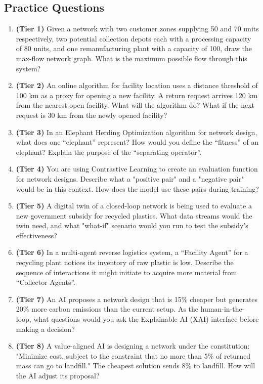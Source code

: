\documentclass{article}
\begin{document}
\newpage
\subsection{Practice Questions}
\begin{enumerate}[label=\textbf{Q\arabic*:}, wide, labelindent=0pt]
    \item \textbf{(Tier 1)} Given a network with two customer zones supplying 50 and 70 units respectively, two potential collection depots each with a processing capacity of 80 units, and one remanufacturing plant with a capacity of 100, draw the max-flow network graph. What is the maximum possible flow through this system?
    \item \textbf{(Tier 2)} An online algorithm for facility location uses a distance threshold of 100 km as a proxy for opening a new facility. A return request arrives 120 km from the nearest open facility. What will the algorithm do? What if the next request is 30 km from the newly opened facility?
    \item \textbf{(Tier 3)} In an Elephant Herding Optimization algorithm for network design, what does one ``elephant'' represent? How would you define the ``fitness'' of an elephant? Explain the purpose of the ``separating operator''.
    \item \textbf{(Tier 4)} You are using Contrastive Learning to create an evaluation function for network designs. Describe what a "positive pair" and a "negative pair" would be in this context. How does the model use these pairs during training?
    \item \textbf{(Tier 5)} A digital twin of a closed-loop network is being used to evaluate a new government subsidy for recycled plastics. What data streams would the twin need, and what "what-if" scenario would you run to test the subsidy's effectiveness?
    \item \textbf{(Tier 6)} In a multi-agent reverse logistics system, a ``Facility Agent'' for a recycling plant notices its inventory of raw plastic is low. Describe the sequence of interactions it might initiate to acquire more material from ``Collector Agents''.
    \item \textbf{(Tier 7)} An AI proposes a network design that is 15\% cheaper but generates 20\% more carbon emissions than the current setup. As the human-in-the-loop, what questions would you ask the Explainable AI (XAI) interface before making a decision?
    \item \textbf{(Tier 8)} A value-aligned AI is designing a network under the constitution: "Minimize cost, subject to the constraint that no more than 5\% of returned mass can go to landfill." The cheapest solution sends 8\% to landfill. How will the AI adjust its proposal?

\end{enumerate}
\end{document}
